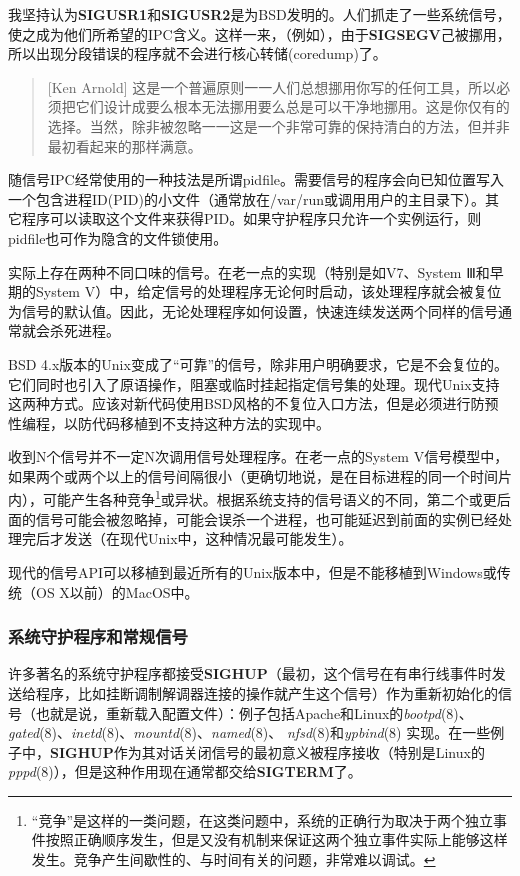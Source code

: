 \documentclass[12pt,oneside]{ctexbook}
\begin{document}
\begin{common-format}
我坚持认为\textbf{SIGUSR1}和\textbf{SIGUSR2}是为BSD发明的。人们抓走了一些系统信号，使之成为他们所希望的IPC含义。这样一来，（例如），由于\textbf{SIGSEGV}己被挪用，所以出现分段错误的程序就不会进行核心转储(coredump)了。

\begin{quote}[Ken Arnold]
这是一个普遍原则一一人们总想挪用你写的任何工具，所以必须把它们设计成要么根本无法挪用要么总是可以干净地挪用。这是你仅有的选择。当然，除非被忽略一一这是一个非常可靠的保持清白的方法，但并非最初看起来的那样满意。
\end{quote}

随信号IPC经常使用的一种技法是所谓pidfile。需要信号的程序会向已知位置写入一个包含进程ID(PID)的小文件（通常放在/var/run或调用用户的主目录下）。其它程序可以读取这个文件来获得PID。如果守护程序只允许一个实例运行，则pidfile也可作为隐含的文件锁使用。

实际上存在两种不同口味的信号。在老一点的实现（特别是如V7、System Ⅲ和早期的System V）中，给定信号的处理程序无论何时启动，该处理程序就会被复位为信号的默认值。因此，无论处理程序如何设置，快速连续发送两个同样的信号通常就会杀死进程。

BSD 4.x版本的Unix变成了“可靠”的信号，除非用户明确要求，它是不会复位的。它们同时也引入了原语操作，阻塞或临时挂起指定信号集的处理。现代Unix支持这两种方式。应该对新代码使用BSD风格的不复位入口方法，但是必须进行防预性编程，以防代码移植到不支持这种方法的实现中。

收到N个信号并不一定N次调用信号处理程序。在老一点的System V信号模型中，如果两个或两个以上的信号间隔很小（更确切地说，是在目标进程的同一个时间片内），可能产生各种竞争\footnote{“竞争”是这样的一类问题，在这类问题中，系统的正确行为取决于两个独立事件按照正确顺序发生，但是又没有机制来保证这两个独立事件实际上能够这样发生。竞争产生间歇性的、与时间有关的问题，非常难以调试。}或异状。根据系统支持的信号语义的不同，第二个或更后面的信号可能会被忽略掉，可能会误杀一个进程，也可能延迟到前面的实例已经处理完后才发送（在现代Unix中，这种情况最可能发生）。

现代的信号API可以移植到最近所有的Unix版本中，但是不能移植到Windows或传统（OS X以前）的MacOS中。


\subsubsection{系统守护程序和常规信号}
许多著名的系统守护程序都接受\textbf{SIGHUP}（最初，这个信号在有串行线事件时发送给程序，比如挂断调制解调器连接的操作就产生这个信号）作为重新初始化的信号（也就是说，重新载入配置文件）：例子包括Apache和Linux的\textit{bootpd}(8)、\textit{gated}(8)、\textit{inetd}(8)、\textit{mountd}(8)、\textit{named}(8)、 \textit{nfsd}(8)和\textit{ypbind}(8) 实现。在一些例子中，\textbf{SIGHUP}作为其对话关闭信号的最初意义被程序接收（特别是Linux的\textit{pppd}(8)），但是这种作用现在通常都交给\textbf{SIGTERM}了。


\end{common-format}
\end{document}
